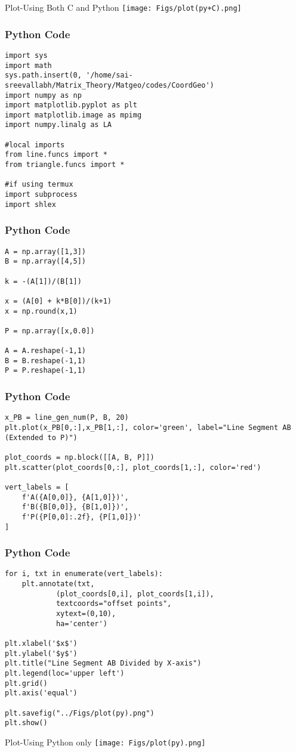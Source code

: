 \documentclass{beamer}
\begin{document}
\begin{frame}{Plot-Using Both C and Python}
    \centering
    \texttt{[image: Figs/plot(py+C).png]}     
\end{frame}



\begin{frame}[fragile]
    \frametitle{Python Code}
    \begin{lstlisting}
import sys
import math
sys.path.insert(0, '/home/sai-sreevallabh/Matrix_Theory/Matgeo/codes/CoordGeo')
import numpy as np
import matplotlib.pyplot as plt
import matplotlib.image as mpimg
import numpy.linalg as LA

#local imports
from line.funcs import *
from triangle.funcs import *

#if using termux
import subprocess
import shlex

\end{lstlisting}
\end{frame}

\begin{frame}[fragile]
    \frametitle{Python Code}
    \begin{lstlisting}
A = np.array([1,3])
B = np.array([4,5])

k = -(A[1])/(B[1])

x = (A[0] + k*B[0])/(k+1)
x = np.round(x,1)

P = np.array([x,0.0])

A = A.reshape(-1,1)
B = B.reshape(-1,1)
P = P.reshape(-1,1)
\end{lstlisting}
\end{frame}

\begin{frame}[fragile]
    \frametitle{Python Code}
    \begin{lstlisting}
x_PB = line_gen_num(P, B, 20)
plt.plot(x_PB[0,:],x_PB[1,:], color='green', label="Line Segment AB (Extended to P)")

plot_coords = np.block([[A, B, P]])
plt.scatter(plot_coords[0,:], plot_coords[1,:], color='red')

vert_labels = [
    f'A({A[0,0]}, {A[1,0]})',
    f'B({B[0,0]}, {B[1,0]})',
    f'P({P[0,0]:.2f}, {P[1,0]})'
]
\end{lstlisting}
\end{frame}

\begin{frame}[fragile]
    \frametitle{Python Code}
    \begin{lstlisting}
for i, txt in enumerate(vert_labels):
    plt.annotate(txt,
            (plot_coords[0,i], plot_coords[1,i]),
            textcoords="offset points",
            xytext=(0,10),
            ha='center')

plt.xlabel('$x$')
plt.ylabel('$y$')
plt.title("Line Segment AB Divided by X-axis")
plt.legend(loc='upper left')
plt.grid()
plt.axis('equal')

plt.savefig("../Figs/plot(py).png")
plt.show()
    \end{lstlisting}
\end{frame}


\begin{frame}{Plot-Using Python only}
    \centering
    \texttt{[image: Figs/plot(py).png]}     
\end{frame}
\end{document}
